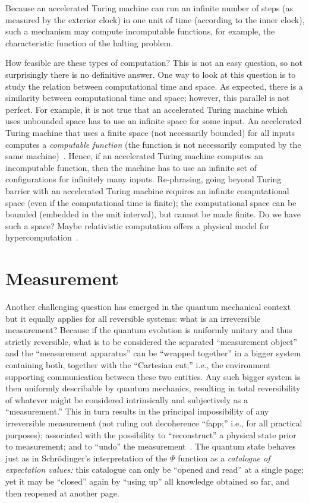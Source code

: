 \documentclass[12pt]{article}
\begin{document}
Because an accelerated Turing machine can run an infinite number of steps
 (as measured by the exterior clock)
in one unit of time (according to the inner clock),
such a mechanism  may compute incomputable functions, for example, the characteristic function of
the halting problem.


How feasible are these
types of computation? This is not an easy question,
so not surprisingly  there is no definitive answer.
One way to look at this question is to study the relation between
 computational time and space. As expected, there is a similarity between computational time and space; however, this
parallel is not perfect. For example, it is not true that an accelerated
Turing machine which uses unbounded space has to use an infinite space for
some input. An accelerated Turing machine that uses a finite space (not necessarily bounded)
for all inputs  computes a  {\it computable function} (the function is not
   necessarily computed by the same machine)~\cite{calude-staiger-09}. Hence, if an accelerated Turing machine
   computes an incomputable function, then the machine has to use an infinite set of configurations  for infinitely many inputs.
Re-phrasing, going beyond Turing barrier with an accelerated Turing machine requires an infinite computational space
(even if the computational time is finite);
the computational space can be bounded (embedded in the unit interval),
 but cannot be made finite. Do we have such a space?
Maybe relativistic computation offers a physical model for hypercomputation~\cite{andreka-2009}.



\section{Measurement}


Another challenging question has emerged in the quantum mechanical context
but it equally applies for all reversible systems:
what is an irreversible measurement?
Because if  the quantum evolution is uniformly unitary and thus strictly reversible,
what is to be considered the separated ``measurement object'' and the ``measurement apparatus''
can be ``wrapped  together'' in a bigger system containing both, together with the ``Cartesian cut;'' i.e., the environment supporting communication between these two entities.
Any such bigger system is then uniformly describable by quantum mechanics, resulting in total reversibility of whatever
might be considered intrinsically and subjectively as a ``measurement.''
This in turn results in the principal impossibility of any irreversible measurement
(not ruling out  decoherence ``fapp;'' i.e., for all practical purposes);
associated with the possibility to ``reconstruct'' a physical state prior to measurement;
and to ``undo'' the measurement~\cite{hkwz}.
The quantum state behaves just as in Schr\"odinger's interpretation of the $\Psi$ function  as
a {\em catalogue of expectation values:} this catalogue can only be ``opened and read'' at a single page;
yet it may be ``closed'' again by ``using up'' all knowledge obtained so far, and then reopened at another page.
\end{document}
